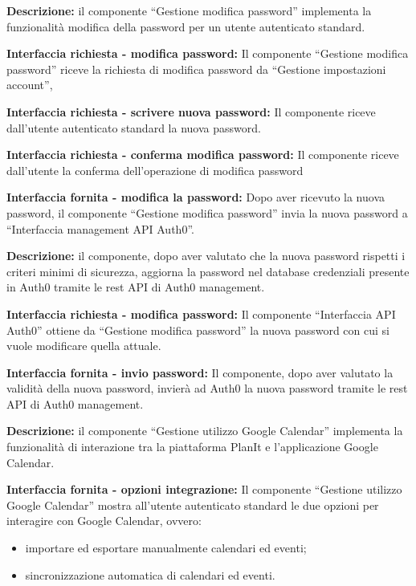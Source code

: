 \begin{listaPersonale}[DCI]{}

    \textbf{Descrizione:} il componente “Gestione modifica password” implementa la funzionalità modifica della password per un utente autenticato standard.

    \textbf{Interfaccia richiesta - modifica password:} Il componente “Gestione modifica password” riceve la richiesta di modifica password da “Gestione impostazioni account”,

    \textbf{Interfaccia richiesta - scrivere nuova password:} Il componente riceve dall'utente autenticato standard la nuova password.

    \textbf{Interfaccia richiesta - conferma modifica password:} Il componente riceve dall'utente la conferma dell'operazione di modifica password

    \textbf{Interfaccia fornita - modifica la password:} Dopo aver ricevuto la nuova password, il componente “Gestione modifica password” invia la nuova password a “Interfaccia management API Auth0”.



    \textbf{Descrizione:} il componente, dopo aver valutato che la nuova password rispetti i criteri minimi di sicurezza, aggiorna la password nel database credenziali presente in Auth0 tramite le rest API di Auth0 management.

    \textbf{Interfaccia richiesta - modifica password:} Il componente “Interfaccia API Auth0” ottiene da “Gestione modifica password” la nuova password con cui si vuole modificare quella attuale.

    \textbf{Interfaccia fornita - invio password:} Il componente, dopo aver valutato la validità della nuova password, invierà ad Auth0 la nuova password tramite le rest API di Auth0 management.



    \textbf{Descrizione:} il componente “Gestione utilizzo Google Calendar” implementa la funzionalità di interazione tra la piattaforma PlanIt e l'applicazione Google Calendar.

    \textbf{Interfaccia fornita - opzioni integrazione:} Il componente “Gestione utilizzo Google Calendar” mostra all'utente autenticato standard le due opzioni per interagire con Google Calendar, ovvero:
    \begin{itemize}
        \item importare ed esportare manualmente calendari ed eventi;
        \item sincronizzazione automatica di calendari ed eventi.
    \end{itemize}


\end{listaPersonale}
